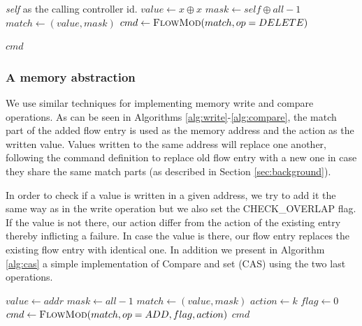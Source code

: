 \documentclass[conference]{sigcomm-alternate}
\newcommand{\concat}[0]{\oplus}
\newcommand{\compare}{compare\xspace}
\newcommand{\memwrite}{write\xspace}
\begin{document}
\begin{algorithm}[H]
    \caption{$\textit{unclaim}(x)$}
    \label{alg:unclaim}
    \begin{algorithmic}[1]
    \Require \emph{self} as the calling controller id.
    		\State $value \gets x\concat x$
    		\State $mask \gets self\concat all-1$
    		\State $match \gets (value,mask)$
    		\State $cmd\gets \textsc{FlowMod}(match, op=DELETE) $
    	
			
			\Return $cmd$
    \end{algorithmic}
\end{algorithm}

\subsubsection{A memory abstraction}


We use similar techniques for implementing memory \memwrite and \compare
 operations.
 As can be seen in Algorithms \ref{alg:write}-\ref{alg:compare},
  the match part of the added flow entry is used as the memory address and the action as the written value. Values written to the same address will replace one another, following the command definition to replace old flow entry with a new one in case they share the same match parts (as described in Section \ref{sec:background}).

In order to check if a value is written in a given address, we try to add it the same way as in the \memwrite operation  but we also set the \textsf{CHECK\_OVERLAP} flag. If the value is not there, our action differ from the action of the existing entry thereby inflicting a failure.
In case the value is there, our flow entry replaces the existing flow entry with identical one.
In addition we present in Algorithm \ref{alg:cas} a simple implementation of Compare and set (CAS) using the two last operations.

\begin{algorithm}[h]
    \caption{$\textit{write}(addr,k)$}
    \label{alg:write}
    \begin{algorithmic}[1]
    		\State $value \gets addr$
    		\State $mask \gets  all-1$
    		\State $match \gets (value,mask)$
    		\State $action \gets k$
    		\State $flag \gets 0$
    		\State $cmd\gets \textsc{FlowMod}(match, op = ADD, flag, action) $
			\Return $cmd$
    \end{algorithmic}
\end{algorithm}
\end{document}
